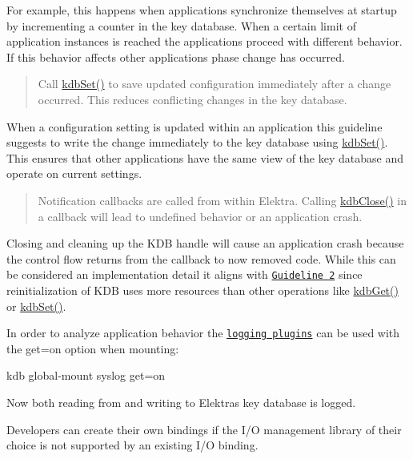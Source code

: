 For example, this happens when applications synchronize themselves at startup by incrementing a counter in the key database. When a certain limit of application instances is reached the applications proceed with different behavior. If this behavior affects other applications phase change has occurred.

\begin{quote}
Call {\ttfamily \hyperlink{group__kdb_ga11436b058408f83d303ca5e996832bcf}{kdb\+Set()}} to save updated configuration immediately after a change occurred. This reduces conflicting changes in the key database. \end{quote}


When a configuration setting is updated within an application this guideline suggests to write the change immediately to the key database using {\ttfamily \hyperlink{group__kdb_ga11436b058408f83d303ca5e996832bcf}{kdb\+Set()}}. This ensures that other applications have the same view of the key database and operate on current settings.

\begin{quote}
Notification callbacks are called from within Elektra. Calling {\ttfamily \hyperlink{group__kdb_gadb54dc9fda17ee07deb9444df745c96f}{kdb\+Close()}} in a callback will lead to undefined behavior or an application crash. \end{quote}


Closing and cleaning up the K\+DB handle will cause an application crash because the control flow returns from the callback to now removed code. While this can be considered an implementation detail it aligns with \href{#guidline-2-wait-before-reacting-to-changes}{\tt Guideline 2} since reinitialization of K\+DB uses more resources than other operations like {\ttfamily \hyperlink{group__kdb_ga28e385fd9cb7ccfe0b2f1ed2f62453a1}{kdb\+Get()}} or {\ttfamily \hyperlink{group__kdb_ga11436b058408f83d303ca5e996832bcf}{kdb\+Set()}}.

In order to analyze application behavior the \href{https://www.libelektra.org/plugins/readme#notification-and-logging}{\tt logging plugins} can be used with the {\ttfamily get=on} option when mounting\+:


\begin{DoxyCode}
kdb global-mount syslog get=on
\end{DoxyCode}


Now both reading from and writing to Elektra\textquotesingle{}s key database is logged.

Developers can create their own bindings if the I/O management library of their choice is not supported by an existing I/O binding.

